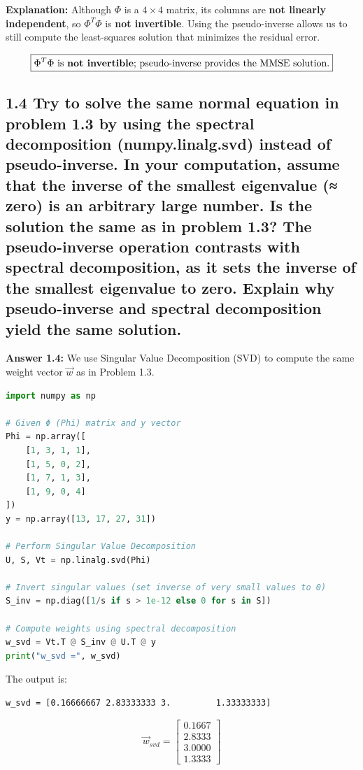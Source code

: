 \documentclass[12pt]{article}
\begin{document}
\textbf{Explanation:}  
Although $\Phi$ is a $4\times4$ matrix, its columns are \textbf{not linearly independent}, so $\Phi^T\Phi$ is \textbf{not invertible}.  
Using the pseudo-inverse allows us to still compute the least-squares solution that minimizes the residual error.

\[
\boxed{\text{$\Phi^T\Phi$ is \textbf{not invertible}; pseudo-inverse provides the MMSE solution.}}
\]

\subsection*{1.4
Try to solve the same normal equation in problem 1.3 by using the spectral decomposition (numpy.linalg.svd) instead of pseudo-inverse. In your computation, assume that the inverse of the smallest eigenvalue (≈ zero) is an arbitrary large number. Is the solution the same as in problem 1.3? The pseudo-inverse operation contrasts with spectral decomposition, as it sets the inverse of the smallest eigenvalue to zero. Explain why pseudo-inverse and spectral decomposition yield the same solution.}

\textbf{Answer 1.4:}  
We use Singular Value Decomposition (SVD) to compute the same weight vector $\vec{w}$ as in Problem 1.3.

\begin{lstlisting}[language=Python]
import numpy as np

# Given Φ (Phi) matrix and y vector
Phi = np.array([
    [1, 3, 1, 1],
    [1, 5, 0, 2],
    [1, 7, 1, 3],
    [1, 9, 0, 4]
])
y = np.array([13, 17, 27, 31])

# Perform Singular Value Decomposition
U, S, Vt = np.linalg.svd(Phi)

# Invert singular values (set inverse of very small values to 0)
S_inv = np.diag([1/s if s > 1e-12 else 0 for s in S])

# Compute weights using spectral decomposition
w_svd = Vt.T @ S_inv @ U.T @ y
print("w_svd =", w_svd)
\end{lstlisting}

\noindent
The output is:
\begin{lstlisting}
w_svd = [0.16666667 2.83333333 3.         1.33333333]
\end{lstlisting}

\[
\boxed{
\vec{w}_{svd} =
\begin{bmatrix}
0.1667\\
2.8333\\
3.0000\\
1.3333
\end{bmatrix}
}
\]
\end{document}
